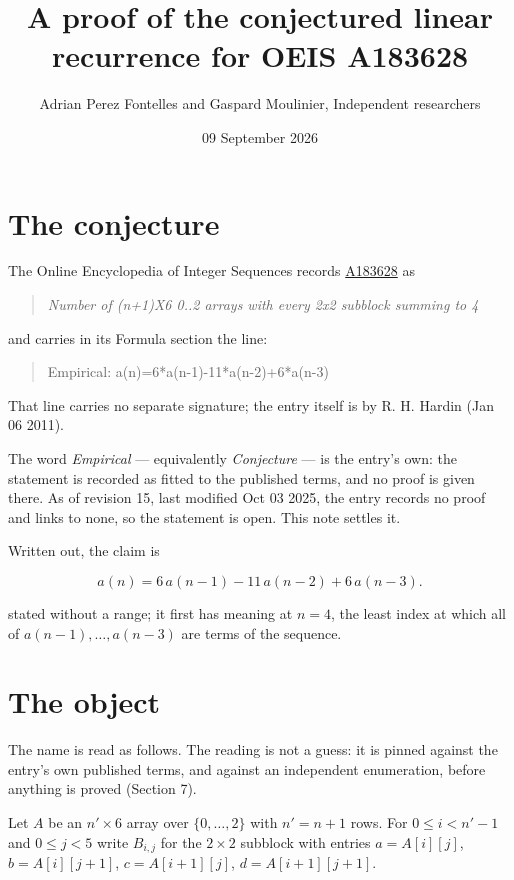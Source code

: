 \documentclass[11pt]{article}
\title{A proof of the conjectured linear recurrence for OEIS A183628}
\author{Adrian Perez Fontelles and Gaspard Moulinier, Independent researchers}
\date{09 September 2026}
\theoremstyle{definition}
\begin{document}
\maketitle
\section{The conjecture}

The Online Encyclopedia of Integer Sequences records \href{https://oeis.org/A183628}{A183628} as

\begin{quote}\itshape Number of (n+1)X6 0..2 arrays with every 2x2 subblock summing to 4\end{quote}

and carries in its Formula section the line:

\begin{quote}\ttfamily Empirical: a(n)=6*a(n-1)-11*a(n-2)+6*a(n-3)\end{quote}

That line carries no separate signature; the entry itself is by R. H. Hardin (Jan 06 2011).

The word {\itshape Empirical} --- equivalently {\itshape Conjecture} --- is the entry's own: the statement is recorded as fitted to the published terms, and no proof is given there. As of revision 15, last modified Oct 03 2025, the entry records no proof and links to none, so the statement is open. This note settles it.

Written out, the claim is

\[a(n) = 6\,a(n-1) - 11\,a(n-2) + 6\,a(n-3).\]

stated without a range; it first has meaning at $n = 4$, the least index at which all of $a(n-1),\dots,a(n-3)$ are terms of the sequence.

\section{The object}

The name is read as follows. The reading is not a guess: it is pinned against the entry's own published terms, and against an independent enumeration, before anything is proved (Section 7).

Let $A$ be an $n' \times 6$ array over $\{0,\dots,2\}$ with $n' = n + 1$ rows. For $0 \le i < n'-1$ and $0 \le j < 5$ write $B_{i,j}$ for the $2\times2$ subblock with entries $a = A[i][j]$, $b = A[i][j{+}1]$, $c = A[i{+}1][j]$, $d = A[i{+}1][j{+}1]$.
\end{document}
